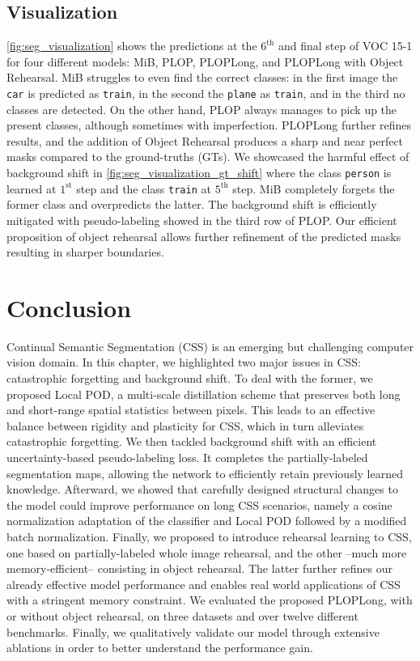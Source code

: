 \subsection{Visualization}

\autoref{fig:seg_visualization} shows the predictions at the $6^\text{th}$ and final step of VOC
15-1 for four different models: MiB, PLOP, PLOPLong, and PLOPLong with Object Rehearsal. MiB
struggles to even find the correct classes: in the first image the \texttt{car} is predicted as
\texttt{train}, in the second the \texttt{plane} as \texttt{train}, and in the third no classes are
detected. On the other hand, PLOP always manages to pick up the present classes, although sometimes
with imperfection. PLOPLong further refines results, and the addition of Object Rehearsal produces a
sharp and near perfect masks compared to the ground-truths (GTs). We showcased the harmful effect of
background shift in \autoref{fig:seg_visualization_gt_shift} where the class \texttt{person} is
learned at $1^\text{st}$ step and the class \texttt{train} at $5^\text{th}$ step. MiB completely
forgets the former class and overpredicts the latter. The background shift is efficiently mitigated
with pseudo-labeling showed in the third row of PLOP. Our efficient proposition of object rehearsal
allows further refinement of the predicted masks resulting in sharper boundaries.

\section{Conclusion}
\label{sec:seg_conclusion}

Continual Semantic Segmentation (\ac{CSS}) is an emerging but challenging computer vision domain. In
this chapter, we highlighted two major issues in \ac{CSS}: catastrophic forgetting and background
shift. To deal with the former, we proposed Local POD, a multi-scale distillation scheme that
preserves both long and short-range spatial statistics between pixels. This leads to an effective
balance between rigidity and plasticity for \ac{CSS}, which in turn alleviates catastrophic
forgetting. We then tackled background shift with an efficient uncertainty-based pseudo-labeling
loss. It completes the partially-labeled segmentation maps, allowing the network to efficiently
retain previously learned knowledge. Afterward, we showed that carefully designed structural changes
to the model could improve performance on long \ac{CSS} scenarios, namely a cosine normalization
adaptation of the classifier and Local POD followed by a modified batch normalization. Finally, we
proposed to introduce rehearsal learning to \ac{CSS}, one based on partially-labeled whole image
rehearsal, and the other --much more memory-efficient-- consisting in object rehearsal. The latter
further refines our already effective model performance and enables real world applications of
\ac{CSS} with a stringent memory constraint. We evaluated the proposed PLOPLong, with or without
object rehearsal, on three datasets and over twelve different benchmarks. Finally, we qualitatively
validate our model through extensive ablations in order to better understand the performance gain.
